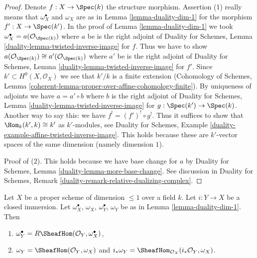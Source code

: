 \begin{proof}
Denote $f : X \to \Spec(k)$ the structure morphism.
Assertion (1) really means that $\omega_X^\bullet$ and $\omega_X$
are as in Lemma \ref{lemma-duality-dim-1} for the morphism
$f' : X \to \Spec(k')$. In the proof of Lemma \ref{lemma-duality-dim-1}
we took $\omega_X^\bullet = a(\mathcal{O}_{\Spec(k)})$
where $a$ be is the right adjoint of
Duality for Schemes, Lemma
\ref{duality-lemma-twisted-inverse-image} for $f$.
Thus we have to show
$a(\mathcal{O}_{\Spec(k)}) \cong a'(\mathcal{O}_{\Spec(k)})$
where $a'$ be is the right adjoint of
Duality for Schemes, Lemma
\ref{duality-lemma-twisted-inverse-image} for $f'$.
Since $k' \subset H^0(X, \mathcal{O}_X)$ we see that $k'/k$ is a finite
extension (Cohomology of Schemes, Lemma
\ref{coherent-lemma-proper-over-affine-cohomology-finite}).
By uniqueness of adjoints we have $a = a' \circ b$ where
$b$ is the right adjoint of Duality for Schemes, Lemma
\ref{duality-lemma-twisted-inverse-image} for $g : \Spec(k') \to \Spec(k)$.
Another way to say this: we have $f^! = (f')^! \circ g^!$.
Thus it suffices to show that $\Hom_k(k', k) \cong k'$ as
$k'$-modules, see Duality for Schemes, Example
\ref{duality-example-affine-twisted-inverse-image}.
This holds because these are $k'$-vector spaces of
the same dimension (namely dimension $1$).

\medskip\noindent
Proof of (2). This holds because we have base change for $a$ by
Duality for Schemes, Lemma \ref{duality-lemma-more-base-change}.
See discussion in Duality for Schemes, Remark
\ref{duality-remark-relative-dualizing-complex}.
\end{proof}

\begin{lemma}
\label{lemma-closed-immersion-dim-1-CM}
Let $X$ be a proper scheme of dimension $\leq 1$ over a field $k$.
Let $i : Y \to X$ be a closed immersion.
Let $\omega_X^\bullet$, $\omega_X$, $\omega_Y^\bullet$, $\omega_Y$
be as in Lemma \ref{lemma-duality-dim-1}. Then
\begin{enumerate}
\item $\omega_Y^\bullet = R\SheafHom(\mathcal{O}_Y, \omega_X^\bullet)$,
\item $\omega_Y = \SheafHom(\mathcal{O}_Y, \omega_X)$ and
$i_*\omega_Y = \SheafHom_{\mathcal{O}_X}(i_*\mathcal{O}_Y, \omega_X)$.
\end{enumerate}
\end{lemma}

